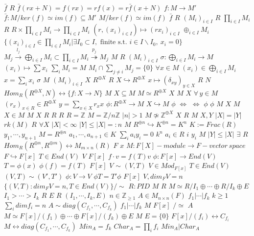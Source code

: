 \documentclass{article}
\begin{document}
$\bar{f}$
$R$
$\bar{f}(rx+N)=f(rx)=rf(x)=r\bar{f}(x+N)$
$f:M \rightarrow M'$
$\bar{f}:M/ker(f) \simeq im(f) \subseteq M'$
$M/ker(f) \simeq im(f)$
$\bar{f}$
$R$
$(M_i)_{i \in I}$
$R$
$\prod_{i \in I} M_i$
$R$
$R \times \prod_{i \in I}M_i \rightarrow \prod_{i \in I}M_i$
$(r,(x_i)_{i \in I}) \mapsto (rx_i)_{i \in I}$
$\oplus_{i \in I}M_i$
$\{(x_i)_{i \in I} \in \prod_{i \in I}M_i| \exists I_0 \subset I, \text{ finite s.t. } i \in I \backslash I_0,\ x_i=0\}$
$M_j \stackrel{l_j}{\longrightarrow} \bigoplus_{i \in I} M_i \subset \prod_{i \in I}M_i \stackrel{p_j}{\twoheadrightarrow}M_j$
$M$
$R$
$(M_i)_{i \in I}$
$\sigma: \bigoplus_{i \in I}M_i \rightarrow M$
$(x_i) \mapsto \sum x_i$
$\sum_i M_i=M$
$M_i\cap\sum_{j \neq i}M_j=\{0\}$
$\forall x \in M$
$(x_i) \in \bigoplus_{i \in I}M_i$
$x=\sum_ix_i$
$\sigma$
$M$
$(M_i)_{i \in I}$
$X$
$R^{\oplus X}$
$R$
$X \hookrightarrow R^{\oplus X}$
$x \mapsto (\delta_{xy})_{y \in X}$
$R$
$N$
$Hom_R(R^{\oplus X},N) \leftrightarrow \{f:X \rightarrow N\}$
$M$
$X \subseteq M$
$M \simeq R^{\oplus X}$
$X$
$M$
$X$
$\forall\,y \in M$
$(r_x)_{x \in R} \in R^{\oplus X}$
$y=\sum_{x \in X}r_x x$
$\phi:R^{\oplus X} \rightarrow M$
$X \hookrightarrow M$
$\phi$
$\Longleftrightarrow$
$\Longleftrightarrow$
$\phi$
$\phi$
$M$
$X$
$M$
$X \in M$
$M$
$X$
$R$
$R$
$R$
$R=\mathbb{Z}$
$M=\mathbb{Z}/n\mathbb{Z}$
$|n|>1$
$M \not\simeq \mathbb{Z}^{\oplus X}$
$X$
$R$
$M$
$X,Y$
$|X|=|Y|$
$rk(M)$
$R$
$\forall X$
$|X|< \infty$
$|Y| \leq |X|=:n$
$M$
$R^{\oplus n} \hookrightarrow K^{\oplus n}=K^n$
$K:=Frac(R)$
$y_1,\cdots,y_{n+1}$
$M=R^{\oplus n}$
$a_1,\cdots,a_{n+1} \in K$
$\sum_ia_iy_i=0$
$k^n$
$a_i \in R$
$i$
$y_i$
$M$
$|Y| \leq |X|$
$\exists$
$R$
$Hom_R(R^{\oplus n},R^{\oplus m}) \leftrightarrow M_{m \times n}(R)$
$F$
$x$
$M:F[X]-module \rightarrow F-vector\ space$
$F \hookrightarrow F[x]$
$T \in End(V)$
$V$
$F[x]$
$f \cdot v=f(T)v$
$\phi:F[x] \rightarrow End(V)$
$T=\phi(x)$
$\phi(f)=f(T)$
$F[x]$
$V$
$\sim$
$(V,T)$
$V \in Mod_{F[x]}$
$T \in End(V)$
$(V,T) \sim (V',T')$
$\phi:V \rightarrow V$
$\phi T=T'\phi$
$F[x]$
$V,dim_FV=n$
$\{(V,T):dim_FV=n,T \in End(V)\}/\sim$
$R:PID$
$M$
$R$
$M \simeq R/I_1 \oplus \cdots \oplus R/I_k \oplus E$
$I_1 > \cdots > I_k$
$R$
$E$
$R$
$(I_1,\cdots,I_k,E)$
$n \in \mathbb{Z}_{\geq 1}$
$A \in M_{n \times n}(F)$
$f_1|\cdots | f_k$
$k \geq 1$
$\sum_{i}dimf_i=n$
$A \sim diag(C_{f_1},\cdots,C_{f_k})$
$f_1|\cdots|f_k$
$M$
$F[x]$
$/\simeq$
$A$
$M \simeq F[x]/(f_1) \oplus \cdots \oplus F[x]/(f_k) \oplus E$
$M$
$E=\{0\}$
$F[x]/(f_i) \leftrightarrow C_{f_i}$
$M \leftrightarrow  diag(C_{f_1},\cdots,C_{f_k})$
$Min_A=f_k$
$Char_A=\prod_if_i$
$Min_A | Char_A$
\end{document}
